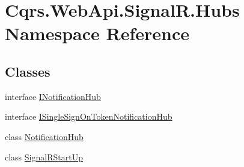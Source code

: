 \hypertarget{namespaceCqrs_1_1WebApi_1_1SignalR_1_1Hubs}{}\section{Cqrs.\+Web\+Api.\+Signal\+R.\+Hubs Namespace Reference}
\label{namespaceCqrs_1_1WebApi_1_1SignalR_1_1Hubs}
\subsection*{Classes}
\begin{DoxyCompactItemize}
\item 
interface \hyperlink{interfaceCqrs_1_1WebApi_1_1SignalR_1_1Hubs_1_1INotificationHub}{I\+Notification\+Hub}
\item 
interface \hyperlink{interfaceCqrs_1_1WebApi_1_1SignalR_1_1Hubs_1_1ISingleSignOnTokenNotificationHub}{I\+Single\+Sign\+On\+Token\+Notification\+Hub}
\item 
class \hyperlink{classCqrs_1_1WebApi_1_1SignalR_1_1Hubs_1_1NotificationHub}{Notification\+Hub}
\item 
class \hyperlink{classCqrs_1_1WebApi_1_1SignalR_1_1Hubs_1_1SignalRStartUp}{Signal\+R\+Start\+Up}
\end{DoxyCompactItemize}
